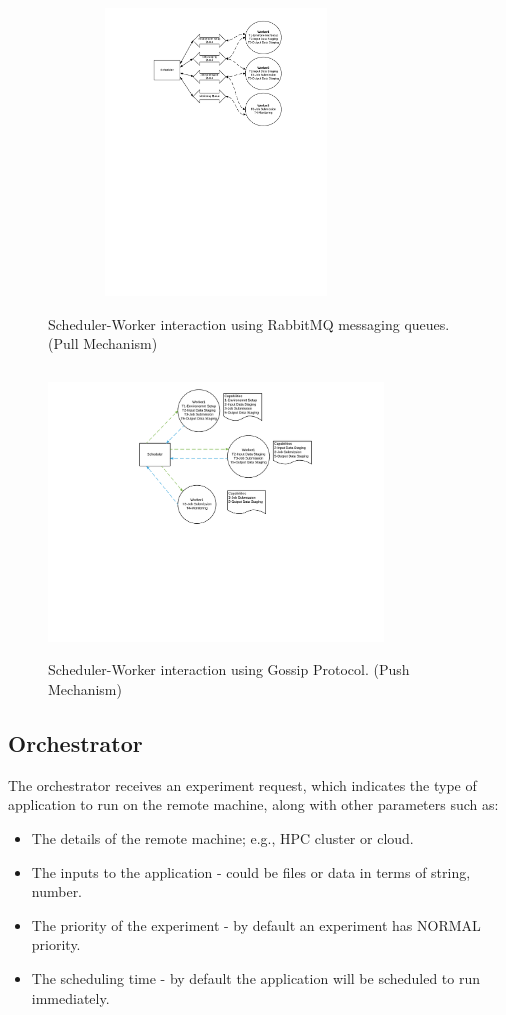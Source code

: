 \documentclass[sigconf]{acmart}
\begin{document}
\begin{figure}[!ht]
     \begin{minipage}[l]{1.0\columnwidth}
         \centering
         \includegraphics[height=3in, width=3.5in]{figures/scheduler-pull-mechanism.pdf}
         \caption{Scheduler-Worker interaction using RabbitMQ messaging queues. (Pull Mechanism)}
     \end{minipage}\label{mage:pull-mechanism}
     \hfill{}
     \begin{minipage}[r]{1.0\columnwidth}
         \centering
         \includegraphics[height=3in, width=3.5in]{figures/scheduler-push-mechanism.pdf}
        \caption{Scheduler-Worker interaction using Gossip Protocol. (Push Mechanism)}
     \end{minipage}\label{image:push-mechanism}
\end{figure}

\subsection{Orchestrator}
The orchestrator receives an experiment request, which indicates the type of application to run on the remote machine, along with other parameters such as:
\begin{itemize}
\item The details of the remote machine; e.g., HPC cluster or cloud.
\item The inputs to the application - could be files or data in terms of string, number.
\item The priority of the experiment - by default an experiment has NORMAL priority.
\item The scheduling time - by default the application will be scheduled to run immediately.
\end{itemize}
\end{document}
